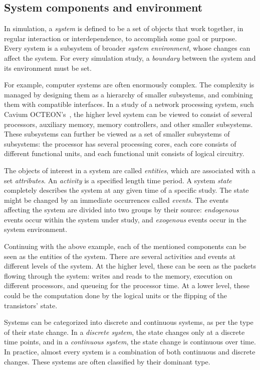 \subsection{System components and environment}
\label{sec:syst-comp-envir}

In simulation, a \emph{system} is defined to be a set of objects that work together, in regular interaction or interdependence, to accomplish some goal or purpose. Every system is a subsystem of broader \emph{system environment}, whose changes can affect the system. For every simulation study, a \emph{boundary} between the system and its environment must be set.~\cite{Banks:2010:DES}

For example, computer systems are often enormously complex. The complexity is managed by designing them as a hierarchy of smaller subsystems, and combining them with compatible interfaces. In a study of a network processing system, such Cavium OCTEON's~\cite{cavium:2010:fundamentals}, the higher level system can be viewed to consist of several processors, auxiliary memory, memory controllers, and other smaller subsystems. These subsystems can further be viewed as a set of smaller subsystems of subsystems: the processor has several processing cores, each core consists of different functional units, and each functional unit consists of logical circuitry.~\cite{Banks:2010:DES}

The objects of interest in a system are called \emph{entities}, which are associated with a set \emph{attributes}. An \emph{activity} is a specified length time period. A system \emph{state} completely describes the system at any given time of a specific study. The state might be changed by an immediate occurrences called \emph{events}. The events affecting the system are divided into two groups by their source: \emph{endogenous} events occur within the system under study, and \emph{exogenous} events occur in the system environment.~\cite{Banks:2010:DES}

Continuing with the above example, each of the mentioned components can be seen as the entities of the system. There are several activities and events at different levels of the system. At the higher level, these can be seen as the packets flowing through the system: writes and reads to the memory, execution on different processors, and queueing for the processor time. At a lower level, these could be the computation done by the logical units or the flipping of the transistors' state.

Systems can be categorized into discrete and continuous systems, as per the type of their state change. In a \emph{discrete system}, the state changes only at a discrete time points, and in a \emph{continuous system}, the state change is continuous over time. In practice, almost every system is a combination of both continuous and discrete changes. These systems are often classified by their dominant type.~\cite{Banks:2010:DES}

